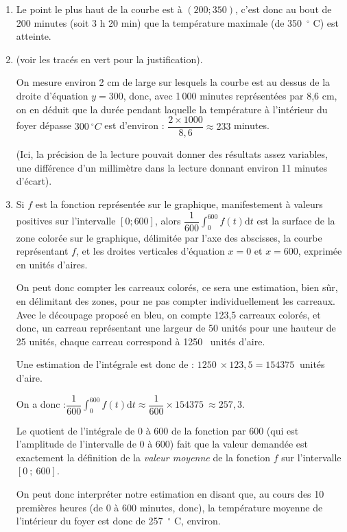 \documentclass[10pt]{article}
\providecommand{\degres}{\ensuremath{^\circ}}
\providecommand{\np}[2][]{{#2~#1}}
\renewcommand{\d}{{\mathrm{d}}}
\providecommand{\degres}{{^\circ}}
\begin{document}
\begin{enumerate}
	\item Le point le plus haut de la courbe est à $(200 ; 350)$, c'est donc au bout de 200 minutes (soit 3 h 20 min) que la température maximale (de 350~\ensuremath{^\circ} C) est atteinte.

	\item (voir les tracés en vert pour la justification).

On mesure environ 2 cm de large sur lesquels la courbe est au dessus de la droite d'équation $y=300$, donc, avec 1\,000 minutes représentées par 8,6 cm, on en déduit que la durée pendant laquelle la température à l'intérieur du foyer dépasse $300~\degres C$ est d'environ : $\dfrac{2\times 1000}{8,6} \approx 233$ minutes.

(Ici, la précision de la lecture pouvait donner des résultats assez variables, une différence d'un millimètre dans la lecture donnant environ 11 minutes d'écart).

	\item Si $f$ est la fonction représentée sur le graphique, manifestement à valeurs positives sur l'intervalle $[0 ; 600]$, alors $\displaystyle\dfrac{1}{600} \int_{0}^{600} f(t) \d t$ est la surface de la zone colorée sur le graphique, délimitée par l'axe des abscisses, la courbe représentant $f$, et les droites verticales d'équation $x = 0$ et $x = 600$, exprimée en unités d'aires.

On peut donc compter les carreaux colorés, ce sera une estimation, bien sûr, en délimitant des zones, pour ne pas compter individuellement les carreaux. Avec le découpage proposé en bleu, on compte 123,5 carreaux colorés, et donc, un carreau représentant une largeur de 50 unités pour une hauteur de 25 unités, chaque carreau correspond à \np{1250} unités d'aire.

Une estimation de l'intégrale est donc de : \quad $\np{1250}\times 123,5 = \np{154375}$ unités d'aire.

On a donc :\quad  $\displaystyle\dfrac{1}{600} \int_{0}^{600} f(t) \d t \approx \dfrac{1}{600}\times \np{154375} \approx 257,3 $.

Le quotient de l'intégrale de 0 à 600 de la fonction par 600 (qui est l'amplitude de l'intervalle de 0 à 600) fait que la valeur demandée est exactement la définition de la \emph{valeur moyenne} de la fonction $f$ sur l'intervalle $[0~;~600]$.

On peut donc interpréter notre estimation en disant que, au cours des 10 premières heures (de 0 à 600 minutes, donc), la température moyenne de l'intérieur du foyer est donc de 257~\ensuremath{^\circ} C, environ.
\end{enumerate}
\end{document}
